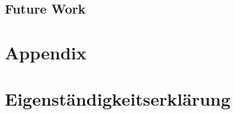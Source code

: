 \documentclass[12pt,a4paper, english]{article}
\begin{document}
% 
\subsection{Future Work}

\newpage
\section{Appendix}
%
%
\newpage
\printbibliography%
\newpage
\section*{Eigenständigkeitserklärung}

\end{document}
